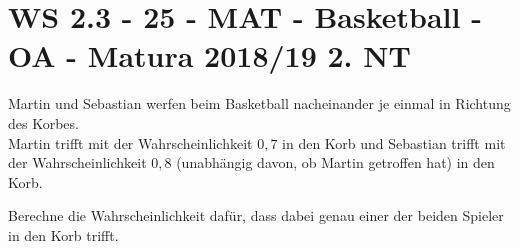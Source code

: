 \section{WS 2.3 - 25 - MAT - Basketball - OA - Matura 2018/19 2. NT}

\begin{beispiel}[WS 2.3]{1}
Martin und Sebastian werfen beim Basketball nacheinander je einmal in Richtung des Korbes.\\
Martin trifft mit der Wahrscheinlichkeit $0,7$ in den Korb und Sebastian trifft mit der Wahrscheinlichkeit $0,8$ (unabhängig davon, ob Martin getroffen hat) in den Korb.

Berechne die Wahrscheinlichkeit dafür, dass dabei genau einer der beiden Spieler in den Korb trifft.

\end{beispiel}